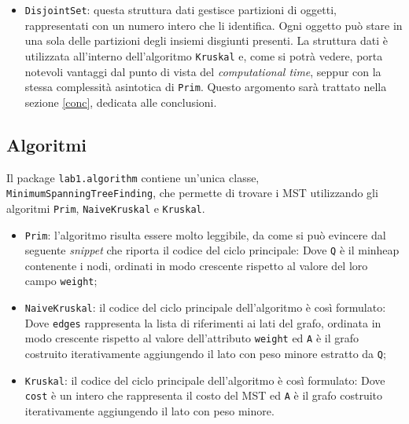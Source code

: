 \begin{itemize}
	\item \texttt{DisjointSet}: questa struttura dati gestisce partizioni di oggetti, rappresentati con un numero intero che li identifica. Ogni oggetto può stare in una sola delle partizioni degli insiemi disgiunti presenti. La struttura dati è utilizzata all'interno dell'algoritmo \texttt{Kruskal} e, come si potrà vedere, porta notevoli vantaggi dal punto di vista del \emph{computational time}, seppur con la stessa complessità asintotica di \texttt{Prim}. Questo argomento sarà trattato nella sezione \ref{conc}, dedicata alle conclusioni.
\end{itemize} 

\subsection{Algoritmi}
Il package \texttt{lab1.algorithm} contiene un'unica classe, \texttt{MinimumSpanningTreeFinding}, che permette di trovare i MST utilizzando gli algoritmi \texttt{Prim}, \texttt{NaiveKruskal} e \texttt{Kruskal}.
\begin{itemize}
	\item \texttt{Prim}: l'algoritmo risulta essere molto leggibile, da come si può evincere dal seguente \emph{snippet} che riporta il codice del ciclo principale:
	Dove \texttt{Q} è il minheap contenente i nodi, ordinati in modo crescente rispetto al valore del loro campo \texttt{weight};
	\item \texttt{NaiveKruskal}: il codice del ciclo principale dell'algoritmo è così formulato:
	Dove \texttt{edges} rappresenta la lista di riferimenti ai lati del grafo, ordinata in modo crescente rispetto al valore dell'attributo \texttt{weight} ed \texttt{A} è il grafo costruito iterativamente aggiungendo il lato con peso minore estratto da \texttt{Q};
	\item \texttt{Kruskal}: il codice del ciclo principale dell'algoritmo è così formulato:
	Dove \texttt{cost} è un intero che rappresenta il costo del MST ed \texttt{A} è il grafo costruito iterativamente aggiungendo il lato con peso minore.
\end{itemize}

